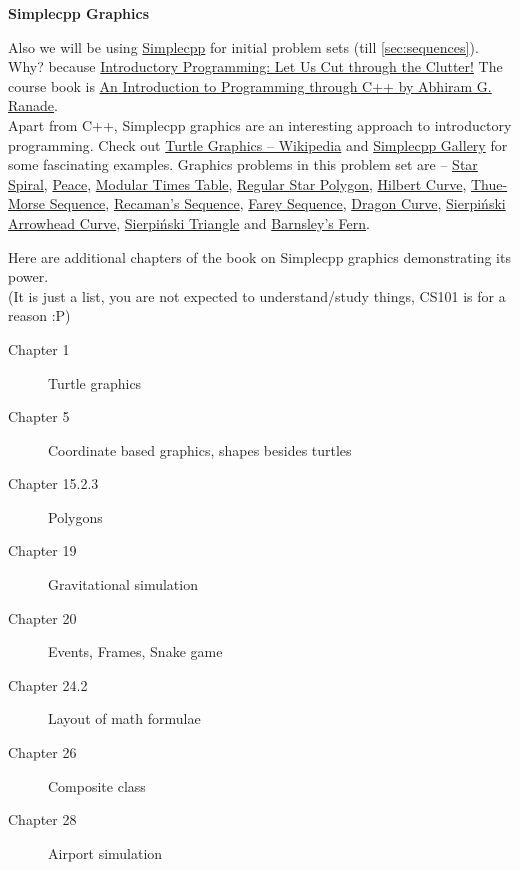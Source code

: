 \begin{center}
	\textbf{\large{Simplecpp Graphics}}
\end{center}
Also we will be using \href{https://www.cse.iitb.ac.in/~ranade/simplecpp/}{Simplecpp} for initial problem sets (till \ref{sec:sequences}).
Why? because \href{https://www.cse.iitb.ac.in/~ranade/iticse16.pdf}{Introductory Programming: Let Us Cut through the Clutter!} The course book is \href{https://www.cse.iitb.ac.in/~ranade/book.html}{An Introduction to Programming through C++ by Abhiram G. Ranade}.\\
Apart from C++, Simplecpp graphics are an interesting approach to introductory programming. Check out \href{https://en.wikipedia.org/wiki/Turtle_graphics}{Turtle Graphics -- Wikipedia} and \href{https://www.cse.iitb.ac.in/~ranade/simplecpp/gallery.html}{Simplecpp Gallery} for some fascinating examples. Graphics problems in this problem set are -- \hyperref[pp:starspiral]{Star Spiral}, \hyperref[pp:peace]{Peace}, \hyperref[pp:timestable]{Modular Times Table}, \hyperref[pp:regularstarpolygon]{Regular Star Polygon}, \hyperref[pp:hilbertcurve]{Hilbert Curve}, \hyperref[pp:thuemorsesequence]{Thue-Morse Sequence}, \hyperref[pp:recamanssequence]{Recaman's Sequence}, \hyperref[pp:fareysequence]{Farey Sequence}, \hyperref[pp:dragoncurve]{Dragon Curve}, \hyperref[pp:sierpinskicurve]{Sierpi\'nski Arrowhead Curve}, \hyperref[pp:sierpinskitriangle]{Sierpi\'nski Triangle} and \hyperref[pp:barnsleyfern]{Barnsley's Fern}. %

Here are additional chapters of the book on Simplecpp graphics demonstrating its power.\\
(It is just a list, you are not expected to understand/study things, CS101 is for a reason :P)
\begin{description}
	\item[Chapter 1] Turtle graphics
	\item[Chapter 5] Coordinate based graphics, shapes besides turtles
	\item[Chapter 15.2.3] Polygons
	\item[Chapter 19] Gravitational simulation
	\item[Chapter 20] Events, Frames, Snake game
	\item[Chapter 24.2] Layout of math formulae
	\item[Chapter 26] Composite class
	\item[Chapter 28] Airport simulation
\end{description}